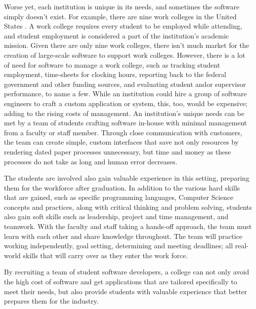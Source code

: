 Worse yet, each institution is unique in its needs, and sometimes the software simply doesn't exist. For example, there are nine work colleges in the United States \cite{WCCMembers, Ecclesia}. A work college requires every student to be employed while attending, and student employment is considered a part of the institution's academic mission. Given there are only nine work colleges, there isn't much market for the creation of large-scale software to support work colleges. However, there is a lot of need for software to manage a work college, such as tracking student employment, time-sheets for clocking hours, reporting back to the federal government and other funding sources, and evaluating student and\/or supervisor performance, to name a few. %
While an institution could hire a group of software engineers to craft a custom application or system, this, too, would be expensive; adding to the rising costs of management. An institution's unique needs can be met by a team of students crafting software in-house with minimal management from a faculty or staff member. Through close communication with customers, the team can create simple, custom interfaces that save not only resources by rendering dated paper processes unnecessary, but time and money as these processes do not take as long and human error decreases. 

The students are involved also gain valuable experience in this setting, preparing them for the workforce after graduation. In addition to  the various hard skills \cite{hardskills} that are gained, such as specific programming languages, Computer Science concepts and practices, along with critical thinking and problem solving, students also gain soft skills \cite{softskills} such as leadership, project and time management, and teamwork. With the faculty and staff taking a hands-off approach, the team must learn with each other and share knowledge throughout. The team will practice working independently, goal setting, determining and meeting deadlines; all real-world skills that will carry over as they enter the work force.

By recruiting a team of student software developers, a college can not only avoid the high cost of software and get applications that are tailored specifically to meet their needs, but also provide students with valuable experience that better prepares them for the industry. 

